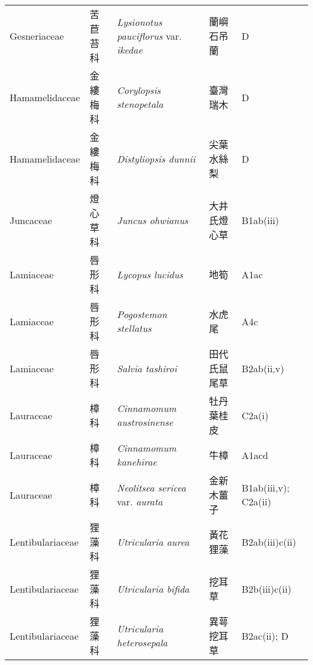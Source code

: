 {\begin{longtable}{p{2.5cm}p{2.5cm}p{4.5cm}p{2.5cm}p{3cm}}
    Gesneriaceae & 苦苣苔科 & \textit{Lysionotus pauciflorus} var. \textit{ikedae}  & 蘭嶼石吊蘭 & D \index{Lysionotus@\textit{Lysionotus}!pauciflorus@\textit{pauciflorus}!var. ikedae@var. \textit{ikedae}}  \index{蘭嶼石吊蘭} \\
    Hamamelidaceae & 金縷梅科 & \textit{Corylopsis stenopetala}  & 臺灣瑞木 & D \index{Corylopsis@\textit{Corylopsis}!stenopetala@\textit{stenopetala}}  \index{臺灣瑞木} \\
    Hamamelidaceae & 金縷梅科 & \textit{Distyliopsis dunnii}  & 尖葉水絲梨 & D \index{Distyliopsis@\textit{Distyliopsis}!dunnii@\textit{dunnii}}  \index{尖葉水絲梨} \\
    Juncaceae & 燈心草科 & \textit{Juncus ohwianus}  & 大井氏燈心草 & B1ab(iii) \index{Juncus@\textit{Juncus}!ohwianus@\textit{ohwianus}}  \index{大井氏燈心草} \\
    Lamiaceae & 唇形科 & \textit{Lycopus lucidus}  & 地筍 & A1ac \index{Lycopus@\textit{Lycopus}!lucidus@\textit{lucidus}}  \index{地筍} \\
    Lamiaceae & 唇形科 & \textit{Pogostemon stellatus}  & 水虎尾 & A4c \index{Pogostemon@\textit{Pogostemon}!stellatus@\textit{stellatus}}  \index{水虎尾} \\
    Lamiaceae & 唇形科 & \textit{Salvia tashiroi}  & 田代氏鼠尾草 & B2ab(ii,v) \index{Salvia@\textit{Salvia}!tashiroi@\textit{tashiroi}}  \index{田代氏鼠尾草} \\
    Lauraceae & 樟科 & \textit{Cinnamomum austrosinense}  & 牡丹葉桂皮 & C2a(i) \index{Cinnamomum@\textit{Cinnamomum}!austrosinense@\textit{austrosinense}}  \index{牡丹葉桂皮} \\
    Lauraceae & 樟科 & \textit{Cinnamomum kanehirae}  & 牛樟 & A1acd \index{Cinnamomum@\textit{Cinnamomum}!kanehirae@\textit{kanehirae}}  \index{牛樟} \\
    Lauraceae & 樟科 & \textit{Neolitsea sericea} var. \textit{aurata}  & 金新木薑子 & B1ab(iii,v); C2a(ii) \index{Neolitsea@\textit{Neolitsea}!sericea@\textit{sericea}!var. aurata@var. \textit{aurata}}  \index{金新木薑子} \\
    Lentibulariaceae & 狸藻科 & \textit{Utricularia aurea}  & 黃花狸藻 & B2ab(iii)c(ii) \index{Utricularia@\textit{Utricularia}!aurea@\textit{aurea}}  \index{黃花狸藻} \\
    Lentibulariaceae & 狸藻科 & \textit{Utricularia bifida}  & 挖耳草 & B2b(iii)c(ii) \index{Utricularia@\textit{Utricularia}!bifida@\textit{bifida}}  \index{挖耳草} \\
    Lentibulariaceae & 狸藻科 & \textit{Utricularia heterosepala}  & 異萼挖耳草 & B2ac(ii); D \index{Utricularia@\textit{Utricularia}!heterosepala@\textit{heterosepala}}  \index{異萼挖耳草} \\

\end{longtable}}

